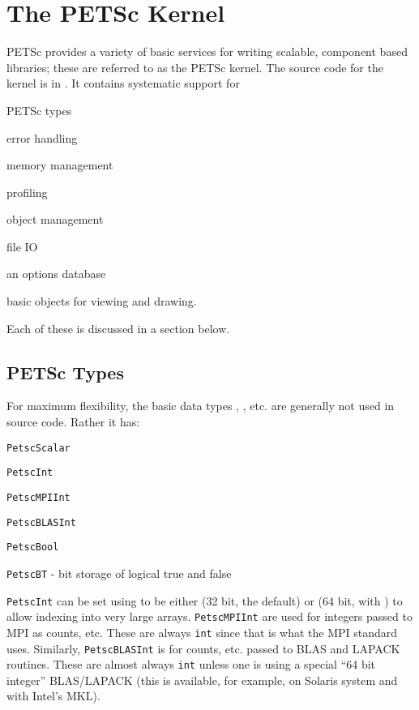 \chapter{The PETSc Kernel}
\label{chapter:kernel}
PETSc provides a variety of basic services for writing scalable, component
based libraries; these are referred to as the PETSc kernel. The source
code for the kernel is in . It contains systematic support for
\begin{tightitemize}
  \item PETSc types
  \item error handling
  \item memory management
  \item profiling
  \item object management
  \item file IO
  \item an options database
  \item basic objects for viewing and drawing.
\end{tightitemize}
Each of these is discussed in a section below.

\section{PETSc Types}
For maximum flexibility, the basic data types , , etc. are
generally not used in source code. Rather it has:
\begin{tightitemize}
  \item \lstinline{PetscScalar}
  \item \lstinline{PetscInt}
  \item \lstinline{PetscMPIInt}
  \item \lstinline{PetscBLASInt}
  \item \lstinline{PetscBool}
  \item \lstinline{PetscBT} - bit storage of logical true and false
\end{tightitemize}
\lstinline{PetscInt} can be set using  to be either  (32 bit, the default) or 
(64 bit, with ) to allow indexing into very large arrays. 
\lstinline{PetscMPIInt} are used for integers passed to MPI as counts, etc. 
These are always \lstinline{int} since that is what the MPI standard uses. 
Similarly, \lstinline{PetscBLASInt} is for counts, etc. passed to BLAS and LAPACK routines. 
These are almost always \lstinline{int} unless one is using a special ``64 bit integer'' BLAS/LAPACK (this is available, for
example, on Solaris system and with Intel's MKL).

